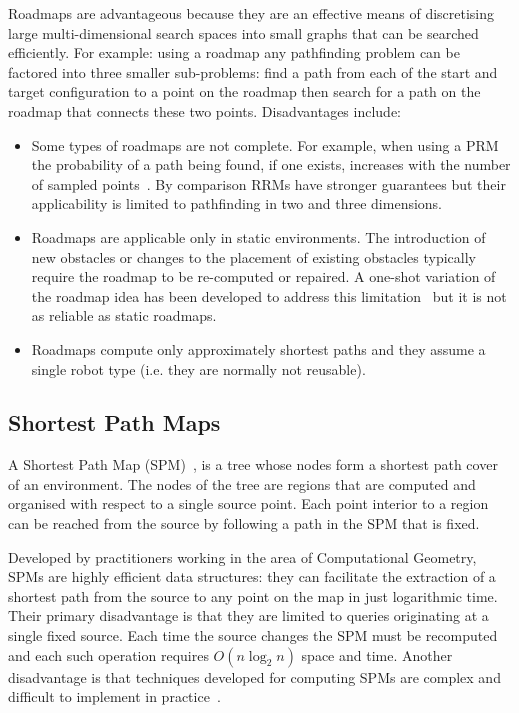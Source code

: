 Roadmaps are advantageous because they are an effective means of discretising
large multi-dimensional search spaces into small graphs that can be searched
efficiently. For example: using a roadmap any pathfinding problem can be
factored into three smaller sub-problems: find a path from each of the start and
target configuration to a point on the roadmap then search for a path on the
roadmap that connects these two points. Disadvantages include:
\begin{itemize}
\item{Some types of roadmaps are not complete. For example, when using a PRM the probability of 
a path being found, if one exists, increases with the number  of sampled points~\citep{barraquand97}. 
By comparison RRMs have stronger guarantees but their applicability
is limited to pathfinding in two and three dimensions.}
\item{Roadmaps are applicable only in static environments. The introduction of
new obstacles or changes to the placement of existing obstacles typically require 
the roadmap to be re-computed or repaired. A one-shot variation of the roadmap idea has been
developed to address this limitation~\citep{lavalle98} but it is not as reliable
as static roadmaps.}
\item{Roadmaps compute only approximately shortest paths and they assume a single 
robot type (i.e. they are normally not reusable).}
\end{itemize}

\subsection{Shortest Path Maps}
\label{cha::lit::graphs::spm}
A Shortest Path Map (SPM)~\citep{mitchell87,mitchell97}, is a tree whose nodes
form a shortest path cover of an environment.  The nodes of the tree are regions
that are computed and organised with respect to a single source point. Each
point interior to a region can be reached from the source by following a path in
the SPM that is fixed.

Developed by practitioners working in the area of Computational Geometry, SPMs
are highly efficient data structures: they can facilitate the extraction
of a shortest path from the source to any point on the map in just logarithmic time.
Their primary disadvantage is that they are limited to queries originating at
a single fixed source. Each time the source changes the SPM must be recomputed and
each such operation requires $O(n\log_2{n})$ space and time. 
Another disadvantage is that techniques developed for computing SPMs are complex 
and difficult to implement in practice~\citep{surazhsky05}. 


